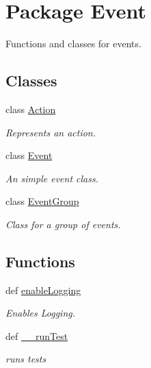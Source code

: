 \hypertarget{namespace_event}{
\section{Package Event}
\label{namespace_event}
}


Functions and classes for events.  


\subsection*{Classes}
\begin{DoxyCompactItemize}
\item 
class \hyperlink{class_event_1_1_action}{Action}
\begin{DoxyCompactList}\small\item\em Represents an action. \item\end{DoxyCompactList}\item 
class \hyperlink{class_event_1_1_event}{Event}
\begin{DoxyCompactList}\small\item\em An simple event class. \item\end{DoxyCompactList}\item 
class \hyperlink{class_event_1_1_event_group}{EventGroup}
\begin{DoxyCompactList}\small\item\em Class for a group of events. \item\end{DoxyCompactList}\end{DoxyCompactItemize}
\subsection*{Functions}
\begin{DoxyCompactItemize}
\item 
def \hyperlink{namespace_event_a71b46d5aba993db8bfdbc2af96bd1bf0}{enableLogging}
\begin{DoxyCompactList}\small\item\em Enables Logging. \item\end{DoxyCompactList}\item 
\hypertarget{namespace_event_ae791bb81023d04ce1ad5cf006e201179}{
def \hyperlink{namespace_event_ae791bb81023d04ce1ad5cf006e201179}{\_\-\_\-runTest}}
\label{namespace_event_ae791bb81023d04ce1ad5cf006e201179}

\begin{DoxyCompactList}\small\item\em runs tests \item\end{DoxyCompactList}\end{DoxyCompactItemize}
